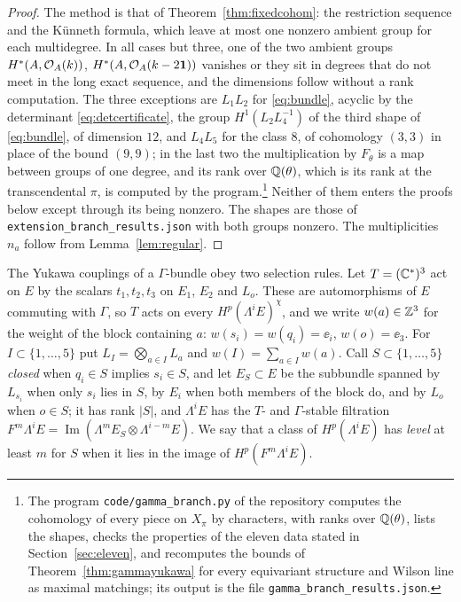 \begin{proof}
The method is that of Theorem~\ref{thm:fixedcohom}: the restriction
sequence and the K\"unneth formula, which leave at most one nonzero
ambient group for each multidegree. In all cases but three, one of the two
ambient groups $H^\ast(A,\mathcal{O}_A(k))$, $H^\ast(A,\mathcal{O}_A(k-2\mathbf{1}))$ vanishes or
they sit in degrees that do not meet in the long exact sequence, and the
dimensions follow without a rank computation. The three exceptions are
$L_1L_2$ for \eqref{eq:bundle}, acyclic by the determinant
\eqref{eq:detcertificate}, the group $H^1(L_2L_4^{-1})$ of the third shape
of \eqref{eq:bundle}, of dimension $12$, and $L_4L_5$ for the class $8$, of
cohomology $(3,3)$ in place of the bound $(9,9)$; in the last two the
multiplication by $F_\theta$ is a map between groups of one degree, and
its rank over $\mathbb{Q}(\theta)$, which is its rank at the transcendental
$\pi$, is computed by the program.\footnote{The program
\texttt{code/gamma\_branch.py} of the repository computes the cohomology
of every piece on $X_\pi$ by characters, with ranks over $\mathbb{Q}(\theta)$,
lists the shapes, checks the properties of the eleven data stated in
Section~\ref{sec:eleven}, and recomputes the bounds of
Theorem~\ref{thm:gammayukawa} for every equivariant structure and Wilson
line as maximal matchings; its output is the file
\texttt{gamma\_branch\_results.json}.} Neither of them enters the proofs
below except through its being nonzero. The shapes are those of
\texttt{extension\_branch\_results.json} with both groups nonzero.
The multiplicities $n_a$ follow from Lemma~\ref{lem:regular}.
\end{proof}

The Yukawa couplings of a $\Gamma$-bundle obey two selection rules. Let
$T=(\mathbb{C}^*)^3$ act on $E$ by the scalars $t_1,t_2,t_3$ on $E_1$, $E_2$ and
$L_o$. These are automorphisms of $E$ commuting with $\Gamma$, so $T$ acts
on every $H^p(\Lambda^iE)^\chi$, and we write $w(a)\in\mathbb{Z}^3$ for the weight
of the block containing $a$: $w(s_i)=w(q_i)=\ee_i$, $w(o)=\ee_3$. For
$I\subset\{1,\dots,5\}$ put $L_I=\bigotimes_{a\in I}L_a$ and
$w(I)=\sum_{a\in I}w(a)$. Call $S\subset\{1,\dots,5\}$ \emph{closed} when
$q_i\in S$ implies $s_i\in S$, and let $E_S\subset E$ be the subbundle
spanned by $L_{s_i}$ when only $s_i$ lies in $S$, by $E_i$ when both members
of the block do, and by $L_o$ when $o\in S$; it has rank $|S|$, and
$\Lambda^iE$ has the $T$- and $\Gamma$-stable filtration
$F^m\Lambda^iE=\operatorname{Im}(\Lambda^mE_S\otimes\Lambda^{i-m}E)$.
We say that a class of $H^p(\Lambda^iE)$ has \emph{level} at least $m$ for
$S$ when it lies in the image of $H^p(F^m\Lambda^iE)$.

